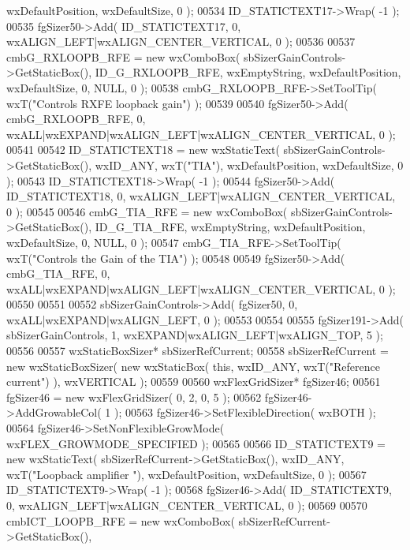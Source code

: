 \begin{DoxyCode}
      wxDefaultPosition, wxDefaultSize, 0 );
00534     ID_STATICTEXT17->Wrap( -1 );
00535     fgSizer50->Add( ID_STATICTEXT17, 0, wxALIGN\_LEFT|wxALIGN\_CENTER\_VERTICAL, 0 );
00536     
00537     cmbG_RXLOOPB_RFE = \textcolor{keyword}{new} wxComboBox( sbSizerGainControls->GetStaticBox(), 
      ID_G_RXLOOPB_RFE, wxEmptyString, wxDefaultPosition, wxDefaultSize, 0, NULL, 0 ); 
00538     cmbG_RXLOOPB_RFE->SetToolTip( wxT(\textcolor{stringliteral}{"Controls RXFE loopback gain"}) );
00539     
00540     fgSizer50->Add( cmbG_RXLOOPB_RFE, 0, wxALL|wxEXPAND|wxALIGN\_LEFT|wxALIGN\_CENTER\_VERTICAL, 0 );
00541     
00542     ID_STATICTEXT18 = \textcolor{keyword}{new} wxStaticText( sbSizerGainControls->GetStaticBox(), wxID\_ANY, wxT(\textcolor{stringliteral}{"TIA"}), 
      wxDefaultPosition, wxDefaultSize, 0 );
00543     ID_STATICTEXT18->Wrap( -1 );
00544     fgSizer50->Add( ID_STATICTEXT18, 0, wxALIGN\_LEFT|wxALIGN\_CENTER\_VERTICAL, 0 );
00545     
00546     cmbG_TIA_RFE = \textcolor{keyword}{new} wxComboBox( sbSizerGainControls->GetStaticBox(), 
      ID_G_TIA_RFE, wxEmptyString, wxDefaultPosition, wxDefaultSize, 0, NULL, 0 ); 
00547     cmbG_TIA_RFE->SetToolTip( wxT(\textcolor{stringliteral}{"Controls the Gain of the TIA"}) );
00548     
00549     fgSizer50->Add( cmbG_TIA_RFE, 0, wxALL|wxEXPAND|wxALIGN\_LEFT|wxALIGN\_CENTER\_VERTICAL, 0 );
00550     
00551     
00552     sbSizerGainControls->Add( fgSizer50, 0, wxALL|wxEXPAND|wxALIGN\_LEFT, 0 );
00553     
00554     
00555     fgSizer191->Add( sbSizerGainControls, 1, wxEXPAND|wxALIGN\_LEFT|wxALIGN\_TOP, 5 );
00556     
00557     wxStaticBoxSizer* sbSizerRefCurrent;
00558     sbSizerRefCurrent = \textcolor{keyword}{new} wxStaticBoxSizer( \textcolor{keyword}{new} wxStaticBox( \textcolor{keyword}{this}, wxID\_ANY, wxT(\textcolor{stringliteral}{"Reference current"}) ), 
      wxVERTICAL );
00559     
00560     wxFlexGridSizer* fgSizer46;
00561     fgSizer46 = \textcolor{keyword}{new} wxFlexGridSizer( 0, 2, 0, 5 );
00562     fgSizer46->AddGrowableCol( 1 );
00563     fgSizer46->SetFlexibleDirection( wxBOTH );
00564     fgSizer46->SetNonFlexibleGrowMode( wxFLEX\_GROWMODE\_SPECIFIED );
00565     
00566     ID_STATICTEXT9 = \textcolor{keyword}{new} wxStaticText( sbSizerRefCurrent->GetStaticBox(), wxID\_ANY, wxT(\textcolor{stringliteral}{"Loopback amplifier
      "}), wxDefaultPosition, wxDefaultSize, 0 );
00567     ID_STATICTEXT9->Wrap( -1 );
00568     fgSizer46->Add( ID_STATICTEXT9, 0, wxALIGN\_LEFT|wxALIGN\_CENTER\_VERTICAL, 0 );
00569     
00570     cmbICT_LOOPB_RFE = \textcolor{keyword}{new} wxComboBox( sbSizerRefCurrent->GetStaticBox(), 

\end{DoxyCode}
